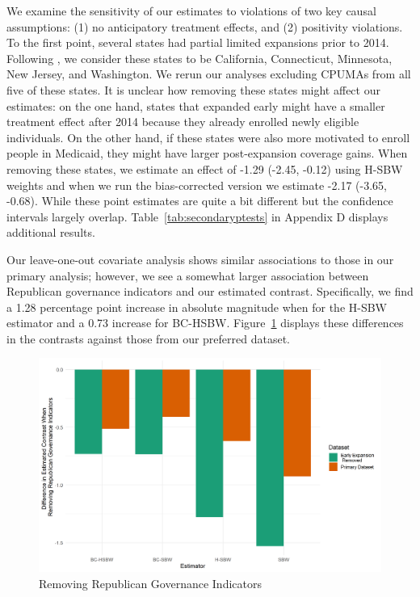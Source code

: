 \documentclass[12pt]{article}
\begin{document}
We examine the sensitivity of our estimates to violations of two key causal assumptions: (1) no anticipatory treatment effects, and (2) positivity violations. To the first point, several states had partial limited expansions prior to 2014. Following \cite{frean2017premium}, we consider these states to be California, Connecticut, Minnesota, New Jersey, and Washington. We rerun our analyses excluding CPUMAs from all five of these states. It is unclear how removing these states might affect our estimates: on the one hand, states that expanded early might have a smaller treatment effect after 2014 because they already enrolled newly eligible individuals. On the other hand, if these states were also more motivated to enroll people in Medicaid, they might have larger post-expansion coverage gains. When removing these states, we estimate an effect of -1.29 (-2.45, -0.12) using H-SBW weights and when we run the bias-corrected version we estimate -2.17 (-3.65, -0.68). While these point estimates are quite a bit different but the confidence intervals largely overlap. Table~\ref{tab:secondaryptests} in Appendix D displays additional results. 

Our leave-one-out covariate analysis shows similar associations to those in our primary analysis; however, we see a somewhat larger association between Republican governance indicators and our estimated contrast. Specifically, we find a 1.28 percentage point increase in absolute magnitude when for the H-SBW estimator and a 0.73 increase for BC-HSBW. Figure~\ref{fig:repub} displays these differences in the contrasts against those from our preferred dataset. 

\begin{figure}[]
\begin{center}
    \includegraphics[scale=0.6]{01_Plots/repub-diff-c1c2.png}
    \caption{Removing Republican Governance Indicators}
    \label{fig:repub}
\end{center}
\end{figure}
\end{document}
